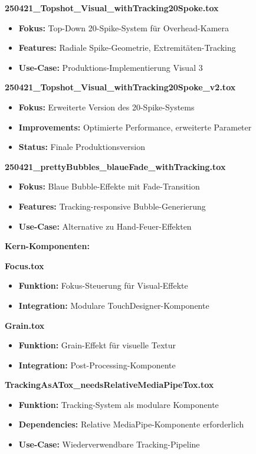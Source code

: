 \textbf{250421\_Topshot\_Visual\_withTracking20Spoke.tox}
\begin{itemize}
    \item \textbf{Fokus:} Top-Down 20-Spike-System für Overhead-Kamera
    \item \textbf{Features:} Radiale Spike-Geometrie, Extremitäten-Tracking
    \item \textbf{Use-Case:} Produktions-Implementierung Visual 3
\end{itemize}

\textbf{250421\_Topshot\_Visual\_withTracking20Spoke\_v2.tox}
\begin{itemize}
    \item \textbf{Fokus:} Erweiterte Version des 20-Spike-Systems
    \item \textbf{Improvements:} Optimierte Performance, erweiterte Parameter
    \item \textbf{Status:} Finale Produktionsversion
\end{itemize}

\textbf{250421\_prettyBubbles\_blaueFade\_withTracking.tox}
\begin{itemize}
    \item \textbf{Fokus:} Blaue Bubble-Effekte mit Fade-Transition
    \item \textbf{Features:} Tracking-responsive Bubble-Generierung
    \item \textbf{Use-Case:} Alternative zu Hand-Feuer-Effekten
\end{itemize}

\textbf{Kern-Komponenten:}

\textbf{Focus.tox}
\begin{itemize}
    \item \textbf{Funktion:} Fokus-Steuerung für Visual-Effekte
    \item \textbf{Integration:} Modulare TouchDesigner-Komponente
\end{itemize}

\textbf{Grain.tox}
\begin{itemize}
    \item \textbf{Funktion:} Grain-Effekt für visuelle Textur
    \item \textbf{Integration:} Post-Processing-Komponente
\end{itemize}

\textbf{TrackingAsATox\_needsRelativeMediaPipeTox.tox}
\begin{itemize}
    \item \textbf{Funktion:} Tracking-System als modulare Komponente
    \item \textbf{Dependencies:} Relative MediaPipe-Komponente erforderlich
    \item \textbf{Use-Case:} Wiederverwendbare Tracking-Pipeline
\end{itemize}


